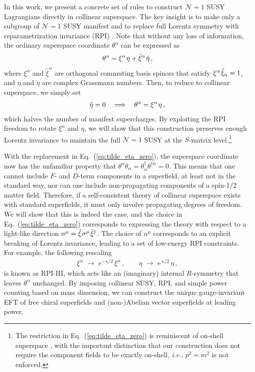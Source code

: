 \documentclass[12pt,document,nofootinbib,superscriptaddress,onecolumn,preprintnumbers,balancelastpage]{article}
\newcommand{\s}{\hspace{0.8pt}}
\DeclareRobustCommand{\Eq}[1]{Eq.~(\ref{#1})}
\begin{document}
\begin{spacing}{1.2}
In this work, we present a concrete set of rules to construct $\mathcal{N}=1$ SUSY Lagrangians directly in collinear superspace.
%
The key insight is to make only a subgroup of $\mathcal{N}=1$ SUSY manifest and to replace full Lorentz symmetry with reparametrization invariance (RPI) \cite{Manohar:2002fd, Becher:2014oda}.
%
Note that without any loss of information, the ordinary superspace coordinate $\theta^\alpha$ can be expressed as
%
\begin{align}
\label{eq:theta_as_eta_tildeeta}
\theta^\alpha = \xi^\alpha\s \eta + {\tilde{\xi}}^{\alpha} \s\tilde{\eta}\,,
\end{align}
%
where $\xi^\alpha$ and $\tilde{\xi}^\alpha$ are orthogonal commuting basis spinors that satisfy $\xi^\alpha \s\tilde{\xi}_\alpha = 1$, and $\eta$ and $\tilde{\eta}$ are complex Grassmann numbers.
%
Then, to reduce to collinear superspace, we simply set
%
\begin{align}
\label{eq:tilde_eta_zero}
\tilde{\eta} = 0 \quad \Longrightarrow \quad \theta^\alpha = \xi^\alpha\s \eta\,,
\end{align}
%
which halves the number of manifest supercharges.
%
By exploiting the RPI freedom to rotate $\xi^\alpha$ and $\eta$, we will show that this construction preserves enough Lorentz invariance to maintain the full $\mathcal{N}=1$ SUSY at the $S$-matrix level.\footnote{The restriction in \Eq{eq:tilde_eta_zero} is reminiscent of on-shell superspace \cite{Gates:1982an, Brink:1980cb, Elvang:2013cua}, with the important distinction that our construction does not require the component fields to be exactly on-shell, \emph{i.e.}, $p^2 = m^2$ is not enforced.}


With the replacement in \Eq{eq:tilde_eta_zero}, the superspace coordinate now has the unfamiliar property that $\theta^\alpha \theta_{\alpha} = \theta^\dagger_{\dot{\alpha}} \theta^{\dagger \dot{\alpha}} = 0$.
%
This means that one cannot include $F$- and $D$-term components in a superfield, at least not in the standard way, nor can one include non-propagating components of a  spin-1/2 matter field.
%
Therefore, if a self-consistent theory of collinear superspace exists with standard superfields, it must only involve propagating degrees of freedom.
%
We will show that this is indeed the case, and the choice in \Eq{eq:tilde_eta_zero} corresponds to expressing the theory with respect to a light-like direction $n^\mu = \tilde{\xi}\s \sigma^\mu\s \tilde{\xi}^\dagger$.
%
The choice of $n^\mu$ corresponds to an explicit breaking of Lorentz invariance, leading to a set of low-energy RPI constraints.  For example, the following rescaling
\begin{align}
\xi^\alpha \,\,\rightarrow\,\, e^{- \kappa/2}\, \xi^\alpha\,, \qquad \eta \,\,\rightarrow\,\, e^{\,\kappa/2}\, \eta\,,
\end{align}
%
is known as RPI-III, which acts like an (imaginary) internal $R$-symmetry that leaves $\theta^\alpha$ unchanged.
%
By imposing collinear SUSY, RPI, and simple power counting based on mass dimension, we can construct the unique gauge-invariant EFT of free chiral superfields and (non-)Abelian vector superfields at leading power.


\end{spacing}
\end{document}

